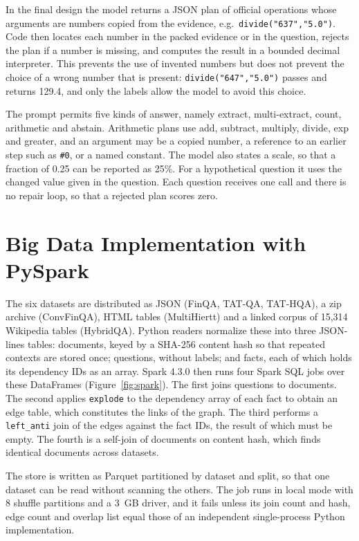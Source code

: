 \documentclass[11pt]{article}
\begin{document}
In the final design the model returns a JSON plan of official operations whose arguments
are numbers copied from the evidence, e.g.\ \texttt{divide("637","5.0")}. Code then locates
each number in the packed evidence or in the question, rejects the plan if a number is
missing, and computes the result in a bounded decimal interpreter. This prevents the use
of invented numbers but does not prevent the choice of a wrong number that is present:
\texttt{divide("647","5.0")} passes and returns 129.4, and only the labels allow the
model to avoid this choice.

The prompt permits five kinds of answer, namely extract, multi-extract, count,
arithmetic and abstain. Arithmetic plans use add, subtract, multiply, divide, exp and
greater, and an argument may be a copied number, a reference to an earlier step such as
\texttt{\#0}, or a named constant. The model also states a scale, so that a fraction of
0.25 can be reported as 25\%. For a hypothetical question it uses the changed value given in the
question. Each question receives one call and there is no repair loop, so that a rejected
plan scores zero.

\section{Big Data Implementation with PySpark}
\label{sec:spark}
The six datasets are distributed as JSON (FinQA, TAT-QA, TAT-HQA), a zip archive
(ConvFinQA), HTML tables (MultiHiertt) and a linked corpus of 15,314 Wikipedia tables
(HybridQA). Python readers normalize these into three JSON-lines tables: documents, keyed
by a SHA-256 content hash so that repeated contexts are stored once; questions, without
labels; and facts, each of which holds its dependency IDs as an array. Spark 4.3.0 then
runs four Spark SQL jobs over these DataFrames (Figure~\ref{fig:spark}). The first joins
questions to documents. The second applies \texttt{explode} to the dependency array of
each fact to obtain an edge table, which constitutes the links of the graph. The third
performs a \texttt{left\_anti} join of the edges against the fact IDs, the result of
which must be empty. The fourth is a self-join of documents on content hash, which finds
identical documents across datasets.

The store is written as Parquet partitioned by dataset and split, so that one dataset can
be read without scanning the others. The job runs in local mode with 8 shuffle partitions
and a 3~GB driver, and it fails unless its join count and hash, edge count and overlap
list equal those of an independent single-process Python implementation.
\end{document}
